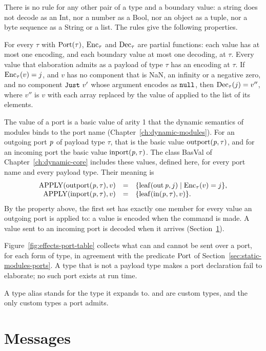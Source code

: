 There is no rule for any other pair of a type and a boundary value: a string
does not decode as an Int, nor a number as a Bool, nor an object as a tuple,
nor a byte sequence as a String or a list. The
rules give the following properties.
\begin{property}
For every $\tau$ with $\mathrm{Port}(\tau)$, $\mathrm{Enc}_{\tau}$ and $\mathrm{Dec}_{\tau}$ are
partial functions: each value has at most one encoding, and each boundary value at
most one decoding, at $\tau$. Every value that elaboration admits as a
payload of type $\tau$ has an encoding at $\tau$. If $\mathrm{Enc}_{\tau}(v)=j$, and
$v$ has no component that is NaN, an infinity or a negative zero, and no
component $\textnormal{\texttt{Just}}\ v'$ whose argument encodes as $\mathtt{null}$, then
$\mathrm{Dec}_{\tau}(j)=v''$, where $v''$ is $v$ with each array replaced by the value
of  applied to the list of its elements.
\end{property}

The value of a port is a basic value of arity 1 that the dynamic semantics of
modules binds to the port name (Chapter~\ref{ch:dynamic-modules}). For an
outgoing port $\mathit{p}$ of payload type $\tau$, that is the basic value
$\mathrm{outport}(\mathit{p},\tau)$, and for an incoming port the basic value
$\mathrm{inport}(\mathit{p},\tau)$. The class BasVal of
Chapter~\ref{ch:dynamic-core} includes these values, defined here, for every
port name and every payload type. Their meaning is
\[
  \begin{array}{rcl}
  \mathrm{APPLY}(\mathrm{outport}(\mathit{p},\tau),v) &=&
    \{\mathrm{leaf}(\mathrm{out}\,\mathit{p},j)\mid\mathrm{Enc}_{\tau}(v)=j\},\\
  \mathrm{APPLY}(\mathrm{inport}(\mathit{p},\tau),v) &=& \{\mathrm{leaf}(\mathrm{in}(\mathit{p},\tau),v)\}.
  \end{array}
\]
By the property above, the first set has exactly one member for every value
an outgoing port is applied to: a value is encoded when the command is made.
A value sent to an incoming port is decoded when it arrives
(Section~\ref{sec:effects-messages}).

Figure~\ref{fig:effects-port-table} collects what can and cannot be sent over
a port, for each form of type, in agreement with the predicate $\mathrm{Port}$ of
Section~\ref{sec:static-modules-ports}. A type that is not a payload type
makes a port declaration fail to elaborate; no such port exists at run time.


A type alias stands for the type it expands to.  and  are
custom types, and the only custom types a port admits.

\section{Messages}\label{sec:effects-messages}

